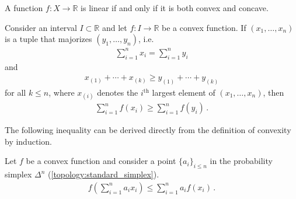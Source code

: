 
    \begin{definition}
        A function $f:X\rightarrow\mathbb{R}$ is linear if and only if it is both convex and concave.
    \end{definition}

    \begin{theorem}
        Consider an interval $I\subset\mathbb{R}$ and let $f:I\rightarrow\mathbb{R}$ be a convex function. If $(x_1,\ldots,x_n)$ is a tuple that majorizes $(y_1,\ldots,y_n)$, i.e.
        \begin{gather}
            \sum_{i=1}^nx_i = \sum_{i=1}^ny_i
        \end{gather}
        and
        \begin{gather}
            x_{(1)} + \cdots + x_{(k)}\geq y_{(1)} + \cdots + y_{(k)}
        \end{gather}
        for all $k\leq n$, where $x_{(i)}$ denotes the $i^{\text{th}}$ largest element of $(x_1,\ldots,x_n)$, then
        \begin{gather}
            \sum_{i=1}^nf(x_i)\geq\sum_{i=1}^nf(y_i)\,.
        \end{gather}
    \end{theorem}

    The following inequality can be derived directly from the definition of convexity by induction.
    \begin{theorem}\label{calculus:jensen_inequality}
        Let $f$ be a convex function and consider a point $\{a_i\}_{i\leq n}$ in the probability simplex $\Delta^n$ (\cref{topology:standard_simplex}).
        \begin{gather}
            f\left(\sum_{i=1}^na_ix_i\right)\leq\sum_{i=1}^na_if(x_i)\,.
        \end{gather}
    \end{theorem}


